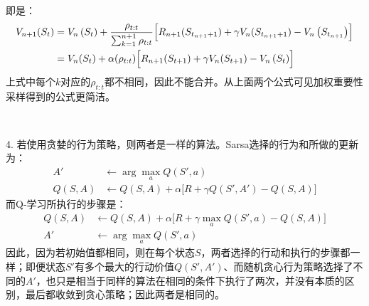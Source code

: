 \documentclass{ctexart}
\begin{document}
   即是：
   \begin{align*}
   V_{n+1}(S_t) &=V_n\left(S_{t}\right) + \frac{\rho_{t:t}}{\sum_{k=1}^{n+1}\rho_{t:t}}\Bigl[R_{n+1}(S_{t_{n+1}+1})+\gamma V_{n}(S_{t_{n+1}+1})-V_n\left(S_{t_{n+1}}\right)\Bigr]\\
   &= V_n(S_{t}) + \alpha(\rho_{t:t})\Bigl[R_{n+1}(S_{t+1})+\gamma V_{n}(S_{t+1})-V_n\left(S_{t}\right)\Bigr]
   \end{align*}
   上式中每个$k$对应的$\rho_{t:t}$都不相同，因此不能合并。从上面两个公式可见加权重要性采样得到的公式更简洁。

   ​

4. 若使用贪婪的行为策略，则两者是一样的算法。Sarsa选择的行为和所做的更新为：
   \begin{align*}
   A' &\leftarrow \arg\max_aQ(S',a)\\
   Q(S,A) &\leftarrow Q(S,A) + \alpha\bigl[R+\gamma Q(S',A')-Q(S,A)\bigr]
   \end{align*}
   而Q-学习所执行的步骤是：
   \begin{align*}
   Q(S,A) &\leftarrow Q(S,A) + \alpha\bigl[ R+\gamma\max_aQ(S',a)-Q(S,A) \bigr]\\
   A' &\leftarrow \arg\max_a Q(S',a)
   \end{align*}
   因此，因为若初始值都相同，则在每个状态$S$，两者选择的行动和执行的步骤都一样；即便状态$S'$有多个最大的行动价值$Q(S',A')$、而随机贪心行为策略选择了不同的$A'$，也只是相当于同样的算法在相同的条件下执行了两次，并没有本质的区别，最后都收敛到贪心策略；因此两者是相同的。
\end{document}
